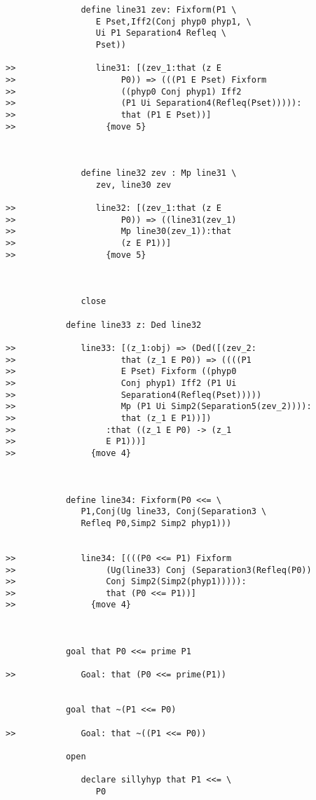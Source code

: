 \documentclass[12pt]{article}
\begin{document}
\begin{verbatim}
               define line31 zev: Fixform(P1 \
                  E Pset,Iff2(Conj phyp0 phyp1, \
                  Ui P1 Separation4 Refleq \
                  Pset))

>>                line31: [(zev_1:that (z E
>>                     P0)) => (((P1 E Pset) Fixform
>>                     ((phyp0 Conj phyp1) Iff2
>>                     (P1 Ui Separation4(Refleq(Pset))))):
>>                     that (P1 E Pset))]
>>                  {move 5}



               define line32 zev : Mp line31 \
                  zev, line30 zev

>>                line32: [(zev_1:that (z E
>>                     P0)) => ((line31(zev_1)
>>                     Mp line30(zev_1)):that
>>                     (z E P1))]
>>                  {move 5}



               close

            define line33 z: Ded line32

>>             line33: [(z_1:obj) => (Ded([(zev_2:
>>                     that (z_1 E P0)) => ((((P1
>>                     E Pset) Fixform ((phyp0
>>                     Conj phyp1) Iff2 (P1 Ui
>>                     Separation4(Refleq(Pset)))))
>>                     Mp (P1 Ui Simp2(Separation5(zev_2)))):
>>                     that (z_1 E P1))])
>>                  :that ((z_1 E P0) -> (z_1
>>                  E P1)))]
>>               {move 4}



            define line34: Fixform(P0 <<= \
               P1,Conj(Ug line33, Conj(Separation3 \
               Refleq P0,Simp2 Simp2 phyp1)))


>>             line34: [(((P0 <<= P1) Fixform
>>                  (Ug(line33) Conj (Separation3(Refleq(P0))
>>                  Conj Simp2(Simp2(phyp1))))):
>>                  that (P0 <<= P1))]
>>               {move 4}



            goal that P0 <<= prime P1

>>             Goal: that (P0 <<= prime(P1))


            goal that ~(P1 <<= P0)

>>             Goal: that ~((P1 <<= P0))

            open

               declare sillyhyp that P1 <<= \
                  P0


\end{verbatim}
\end{document}
